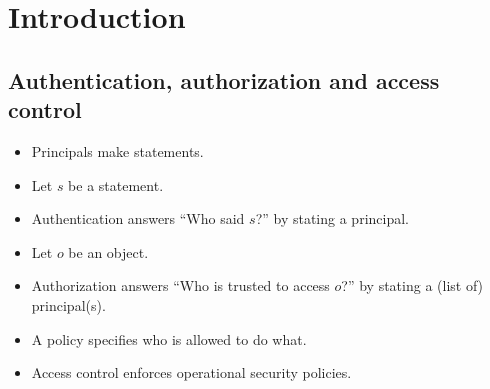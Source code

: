 \mode*




\section{Introduction}

\subsection{Authentication, authorization and access control}

\begin{frame}
  \begin{definition}[Authentication]
    \begin{itemize}
      \item Principals make statements.

      \item Let \(s\) be a statement.

      \item Authentication answers \enquote{Who said \(s\)?} by stating 
        a principal.
    \end{itemize}
  \end{definition}

  \pause

  \begin{definition}[Authorization]
    \begin{itemize}
      \item Let \(o\) be an object.

      \item Authorization answers \enquote{Who is trusted to access \(o\)?} by 
        stating a (list of) principal(s).
    \end{itemize}
  \end{definition}
\end{frame}

\begin{frame}
  \begin{itemize}
    \item A policy specifies who is allowed to do what.

    \item Access control enforces operational security policies.
  \end{itemize}
\end{frame}

